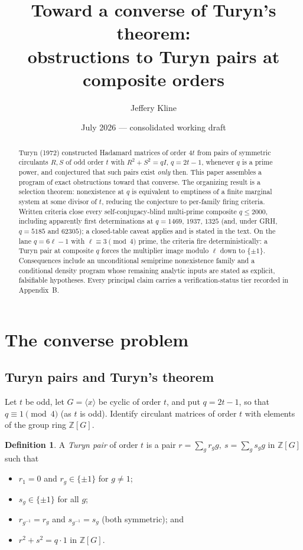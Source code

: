 \documentclass[11pt]{article}
\title{Toward a converse of Turyn's theorem:\\
obstructions to Turyn pairs at composite orders}
\author{Jeffery Kline}
\date{July 2026 --- consolidated working draft}
\theoremstyle{plain}
\theoremstyle{definition}
\newtheorem{definition}[theorem]{Definition}
\theoremstyle{remark}
\newcommand{\Z}{\mathbb Z}
\begin{document}
\maketitle


\begin{abstract}
Turyn (1972) constructed Hadamard matrices of order $4t$ from pairs of
symmetric circulants $R,S$ of odd order $t$ with $R^2+S^2=qI$, $q=2t-1$,
whenever $q$ is a prime power, and conjectured that such pairs exist
\emph{only} then. This paper assembles a program of exact obstructions
toward that converse. The organizing result is a selection theorem:
nonexistence at $q$ is equivalent to emptiness of a finite marginal system
at some divisor of $t$, reducing the conjecture to per-family firing
criteria. Written criteria close every self-conjugacy-blind multi-prime
composite $q\le2000$, including apparently first determinations at
$q=1469$, $1937$, $1325$ (and, under GRH, $q=5185$ and $62305$); a
closed-table caveat applies and is stated in the text. On the lane
$q=6\ell-1$ with $\ell\equiv3\pmod4$ prime, the criteria fire
deterministically: a Turyn pair at composite $q$ forces the multiplier
image modulo $\ell$ down to $\{\pm1\}$. Consequences include an
unconditional semiprime nonexistence family and a conditional density
program whose remaining analytic inputs are stated as explicit,
falsifiable hypotheses. Every principal claim carries a verification-status
tier recorded in Appendix~B.
\end{abstract}

\tableofcontents

\section{The converse problem}\label{sec:intro}

\subsection{Turyn pairs and Turyn's theorem}

Let $t$ be odd, let $G=\langle x\rangle$ be cyclic of order $t$, and put
$q=2t-1$, so that $q\equiv1\pmod4$ (as $t$ is odd). Identify circulant matrices
of order $t$ with elements of the group ring $\Z[G]$.

\begin{definition}\label{def:turyn-pair}
A \emph{Turyn pair} of order $t$ is a pair $r=\sum_g r_g g,\ s=\sum_g s_g g$ in
$\Z[G]$ such that
\begin{itemize}
\item $r_1=0$ and $r_g\in\{\pm1\}$ for $g\ne1$;
\item $s_g\in\{\pm1\}$ for all $g$;
\item $r_{g^{-1}}=r_g$ and $s_{g^{-1}}=s_g$ (both symmetric); and
\item $r^2+s^2=q\cdot1$ in $\Z[G]$.
\end{itemize}
\end{definition}
\end{document}
